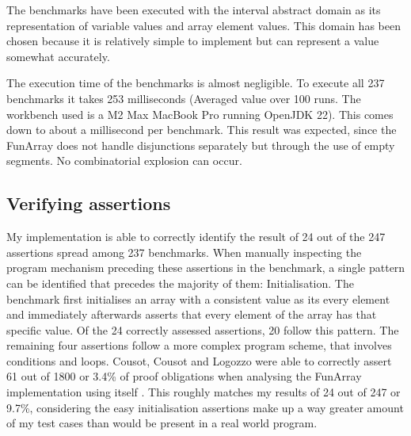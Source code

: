 \documentclass{report}
\begin{document}
The benchmarks have been executed with the interval abstract domain as its representation of variable values and array element values. This domain has been chosen because it is relatively simple to implement but can represent a value somewhat accurately.

The execution time of the benchmarks is almost negligible. To execute all 237 benchmarks it takes 253 milliseconds (Averaged value over 100 runs. The workbench used is a M2 Max MacBook Pro running OpenJDK 22). This comes down to about a millisecond per benchmark. This result was expected, since the FunArray does not handle disjunctions separately but through the use of empty segments. No combinatorial explosion can occur.


\subsection{Verifying assertions}

My implementation is able to correctly identify the result of 24 out of the 247 assertions spread among 237 benchmarks. When manually inspecting the program mechanism preceding these assertions in the benchmark, a single pattern can be identified that precedes the majority of them: Initialisation. The benchmark first initialises an array with a consistent value as its every element and immediately afterwards asserts that every element of the array has that specific value. Of the 24 correctly assessed assertions, 20 follow this pattern. The remaining four assertions follow a more complex program scheme, that involves conditions and loops.
Cousot, Cousot and Logozzo were able to correctly assert 61 out of 1800 or 3.4\% of proof obligations when analysing the FunArray implementation using itself \cite{cousot2011}. This roughly matches my results of 24 out of 247 or 9.7\%, considering the easy initialisation assertions make up a way greater amount of my test cases than would be present in a real world program.
\end{document}
